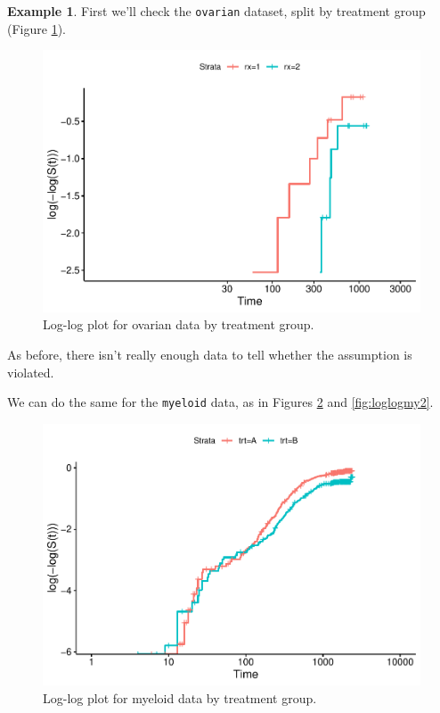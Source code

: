 \documentclass[
  openany]{book}
\theoremstyle{definition}
\theoremstyle{definition}
\newtheorem{example}{Example}[chapter]
\theoremstyle{definition}
\theoremstyle{definition}
\theoremstyle{remark}
\begin{document}
\begin{example}
First we'll check the \texttt{ovarian} dataset, split by treatment group (Figure \ref{fig:loglogov}).

\begin{figure}
\centering
\includegraphics{CT4H_notes_files/figure-latex/loglogov-1.pdf}
\caption{\label{fig:loglogov}Log-log plot for ovarian data by treatment group.}
\end{figure}

As before, there isn't really enough data to tell whether the assumption is violated.

We can do the same for the \texttt{myeloid} data, as in Figures \ref{fig:loglogmy} and \ref{fig:loglogmy2}.

\begin{figure}
\centering
\includegraphics{CT4H_notes_files/figure-latex/loglogmy-1.pdf}
\caption{\label{fig:loglogmy}Log-log plot for myeloid data by treatment group.}
\end{figure}


\end{example}
\end{document}
